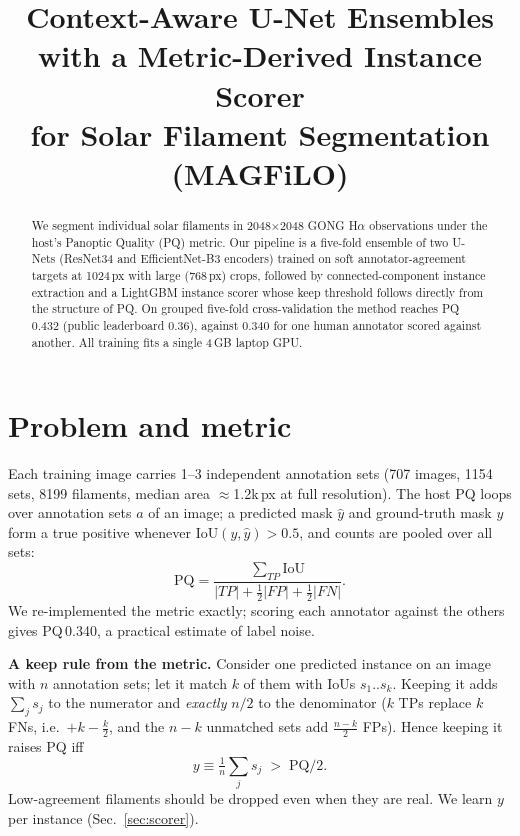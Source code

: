 \documentclass[conference]{IEEEtran}
\begin{document}
\title{Context-Aware U-Net Ensembles with a Metric-Derived Instance Scorer\\for Solar Filament Segmentation (MAGFiLO)}
\author{}
\maketitle

\begin{abstract}
We segment individual solar filaments in 2048$\times$2048 GONG H$\alpha$ observations under the
host's Panoptic Quality (PQ) metric. Our pipeline is a five-fold ensemble of two U-Nets (ResNet34
and EfficientNet-B3 encoders) trained on soft annotator-agreement targets at 1024\,px with large
(768\,px) crops, followed by connected-component instance extraction and a LightGBM instance
scorer whose keep threshold follows directly from the structure of PQ. On grouped five-fold
cross-validation the method reaches PQ\,0.432 (public leaderboard 0.36), against 0.340 for one
human annotator scored against another. All training fits a single 4\,GB laptop GPU.
\end{abstract}

\section{Problem and metric}
Each training image carries 1--3 independent annotation sets (707 images, 1154 sets,
8199 filaments, median area $\approx$1.2k\,px at full resolution). The host PQ loops over
annotation sets $a$ of an image; a predicted mask $\hat y$ and ground-truth mask $y$ form a true
positive whenever $\mathrm{IoU}(y,\hat y)>0.5$, and counts are pooled over all sets:
\begin{equation}
\mathrm{PQ}=\frac{\sum_{TP}\mathrm{IoU}}{|TP|+\tfrac12|FP|+\tfrac12|FN|}.
\end{equation}
We re-implemented the metric exactly; scoring each annotator against the others gives
PQ\,0.340, a practical estimate of label noise.

\textbf{A keep rule from the metric.} Consider one predicted instance on an image with $n$
annotation sets; let it match $k$ of them with IoUs $s_1..s_k$. Keeping it adds $\sum_j s_j$ to the
numerator and \emph{exactly} $n/2$ to the denominator ($k$ TPs replace $k$ FNs, i.e.\ $+k-\frac k2$,
and the $n-k$ unmatched sets add $\frac{n-k}{2}$ FPs). Hence keeping it raises PQ iff
\begin{equation}
y \equiv \tfrac1n\textstyle\sum_j s_j \;>\; \mathrm{PQ}/2 .
\end{equation}
Low-agreement filaments should be dropped even when they are real. We learn $y$ per instance
(Sec.~\ref{sec:scorer}).
\end{document}
